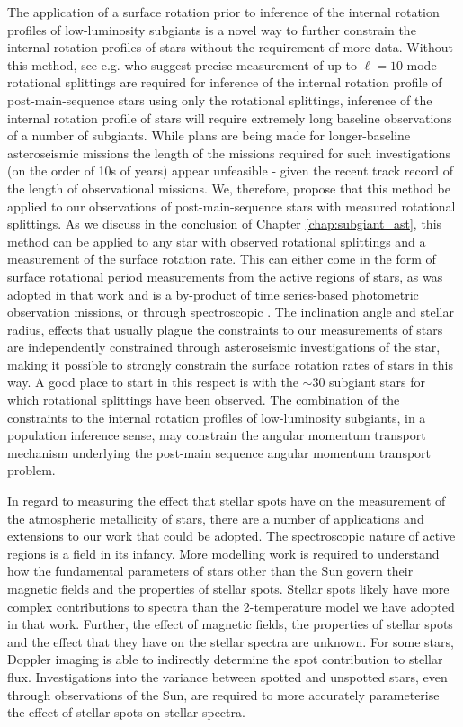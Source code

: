 The application of a surface rotation prior to inference of the internal rotation profiles of low-luminosity subgiants is a novel way to further constrain the internal rotation profiles of stars without the requirement of more data.
Without this method, see e.g. \citet{ahlborn_asteroseismic_2020} who suggest precise measurement of up to $\ell = 10$ mode rotational splittings are required for inference of the internal rotation profile of post-main-sequence stars using only the rotational splittings, inference of the internal rotation profile of stars will require extremely long baseline observations of a number of subgiants.
While plans are being made for longer-baseline asteroseismic missions \citep{rauer_plato_2014, akeson_wide_2019, miglio_haydn_2021} the length of the missions required for such investigations (on the order of 10s of years) appear unfeasible - given the recent track record of the length of observational missions.
We, therefore, propose that this method be applied to our observations of post-main-sequence stars with measured rotational splittings.
As we discuss in the conclusion of Chapter \ref{chap:subgiant_ast}, this method can be applied to any star with observed rotational splittings and a measurement of the surface rotation rate.
This can either come in the form of surface rotational period measurements from the active regions of stars, as was adopted in that work and is a by-product of time series-based photometric observation missions, or through spectroscopic \vsini.
The inclination angle and stellar radius, effects that usually plague the constraints to our measurements of stars are independently constrained through asteroseismic investigations of the star, making it possible to strongly constrain the surface rotation rates of stars in this way.
A good place to start in this respect is with the $\sim$30 subgiant stars for which rotational splittings have been observed.
The combination of the constraints to the internal rotation profiles of low-luminosity subgiants, in a population inference sense, may constrain the angular momentum transport mechanism underlying the post-main sequence angular momentum transport problem.

In regard to measuring the effect that stellar spots have on the measurement of the atmospheric metallicity of stars, there are a number of applications and extensions to our work that could be adopted.
The spectroscopic nature of active regions is a field in its infancy.
More modelling work is required to understand how the fundamental parameters of stars other than the Sun govern their magnetic fields and the properties of stellar spots.
Stellar spots likely have more complex contributions to spectra than the 2-temperature model we have adopted in that work.
Further, the effect of magnetic fields, the properties of stellar spots and the effect that they have on the stellar spectra are unknown.
For some stars, Doppler imaging is able to indirectly determine the spot contribution to stellar flux.
Investigations into the variance between spotted and unspotted stars, even through observations of the Sun, are required to more accurately parameterise the effect of stellar spots on stellar spectra.

